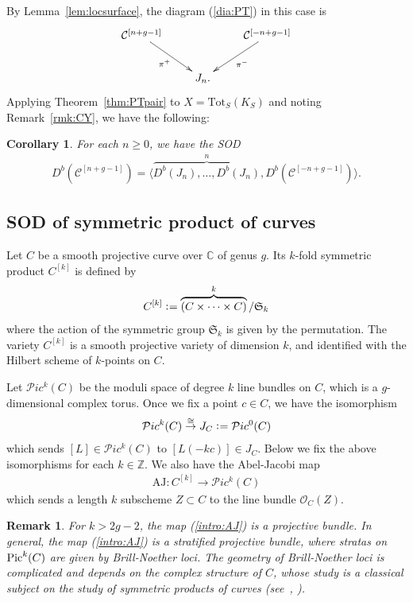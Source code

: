 \documentclass[11pt]{amsart}
\theoremstyle{plain}
\newtheorem{rmk}[thm]{Remark}
\newtheorem{cor}[thm]{Corollary}
\newcommand{\cC}{\mathcal{C}}
\newcommand{\oO}{\mathcal{O}}
\newcommand{\pP}{\mathcal{P}}
\newcommand{\Pic}{\mathop{\rm Pic}\nolimits}
\begin{document}
By Lemma~\ref{lem:locsurface},
the diagram (\ref{dia:PT}) in this case 
is
\begin{align}\label{dia:PT:loc}
\xymatrix{
\cC^{[n+g-1]} \ar[rd]_-{\pi^+} & & \ar[ld]^-{\pi^-} \cC^{[-n+g-1]} \\
& J_n. &
}
\end{align}
Applying Theorem~\ref{thm:PTpair}
to $X=\mathrm{Tot}_S(K_S)$ 
and noting Remark~\ref{rmk:CY}, 
we have the following: 
\begin{cor}\label{cor:locsurface}
For each $n\ge 0$, we have the SOD
\begin{align*}
D^b(\cC^{[n+g-1]})=
\langle \overbrace{D^b(J_{n}), \ldots, 
D^b(J_{n})}^{n}, D^b(\cC^{[-n+g-1]}) \rangle. 
\end{align*}
\end{cor} 




\subsection{SOD of symmetric product of curves}
Let $C$ be a smooth projective curve
over $\mathbb{C}$ of genus $g$. Its $k$-fold 
symmetric product $C^{[k]}$ is defined by 
\begin{align*}
C^{[k]} \cneq \overbrace{(C \times \cdots \times C)}^k/\mathfrak{S}_k
\end{align*}
where the action of the symmetric group $\mathfrak{S}_k$ is given by 
the permutation. 
The variety $C^{[k]}$ is a smooth projective variety of dimension $k$, and 
identified with the Hilbert scheme of $k$-points on $C$. 

Let $\pP ic^k(C)$ be the moduli space of degree $k$ line bundles on $C$, which is a $g$-dimensional complex torus. 
Once we fix a point $c \in C$, 
we have the isomorphism
\begin{align}\label{isom:pic}
\pP ic^k(C) \stackrel{\cong}{\to} J_C \cneq \pP ic^0(C)
\end{align}
which sends $[L] \in \pP ic^k(C)$ to 
$[L(-kc)] \in J_C$. 
Below we fix the above isomorphisms for each 
$k \in \mathbb{Z}$. 
We also have the Abel-Jacobi map 
\begin{align}\label{intro:AJ}
\mathrm{AJ} \colon 
C^{[k]} \to \pP ic^k(C)
\end{align}
which sends a length $k$ subscheme 
$Z \subset C$
to the line bundle $\oO_C(Z)$. 
\begin{rmk}\label{rmk:AJ}
For $k>2g-2$, the map (\ref{intro:AJ})
is a projective bundle. In general, 
the map (\ref{intro:AJ}) is a stratified projective bundle, 
where stratas on $\Pic^k(C)$ are given by 
Brill-Noether loci. 
The geometry of Brill-Noether loci is complicated and depends on 
the complex structure of $C$, whose study is a classical subject 
on the study of symmetric products of curves 
(see~\cite[Section~5]{Flamini}, \cite[Example~1.0.7-1.0.10]{MR3114949}). 
\end{rmk}
\end{document}
